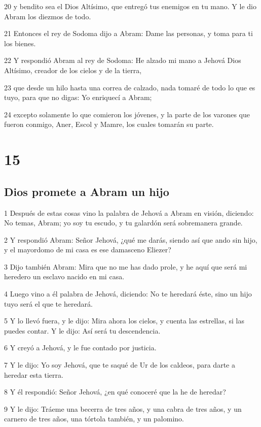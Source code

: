 20 y bendito sea el Dios Altísimo, que entregó tus enemigos en tu mano. Y le dio Abram los diezmos de todo.

21 Entonces el rey de Sodoma dijo a Abram: Dame las personas, y toma para ti los bienes.

22 Y respondió Abram al rey de Sodoma: He alzado mi mano a Jehová Dios Altísimo, creador de los cielos y de la tierra,

23 que desde un hilo hasta una correa de calzado, nada tomaré de todo lo que es tuyo, para que no digas: Yo enriquecí a Abram;

24 excepto solamente lo que comieron los jóvenes, y la parte de los varones que fueron conmigo, Aner, Escol y Mamre, los cuales tomarán su parte.

\chapter{15}

\section{Dios promete a Abram un hijo}

1 Después de estas cosas vino la palabra de Jehová a Abram en visión, diciendo: No temas, Abram; yo soy tu escudo, y tu galardón será sobremanera grande.

2 Y respondió Abram: Señor Jehová, ¿qué me darás, siendo así que ando sin hijo, y el mayordomo de mi casa es ese damasceno Eliezer?

3 Dijo también Abram: Mira que no me has dado prole, y he aquí que será mi heredero un esclavo nacido en mi casa.

4 Luego vino a él palabra de Jehová, diciendo: No te heredará éste, sino un hijo tuyo será el que te heredará.

5 Y lo llevó fuera, y le dijo: Mira ahora los cielos, y cuenta las estrellas, si las puedes contar. Y le dijo: Así será tu descendencia.

6 Y creyó a Jehová, y le fue contado por justicia.

7 Y le dijo: Yo soy Jehová, que te saqué de Ur de los caldeos, para darte a heredar esta tierra.

8 Y él respondió: Señor Jehová, ¿en qué conoceré que la he de heredar?

9 Y le dijo: Tráeme una becerra de tres años, y una cabra de tres años, y un carnero de tres años, una tórtola también, y un palomino.

